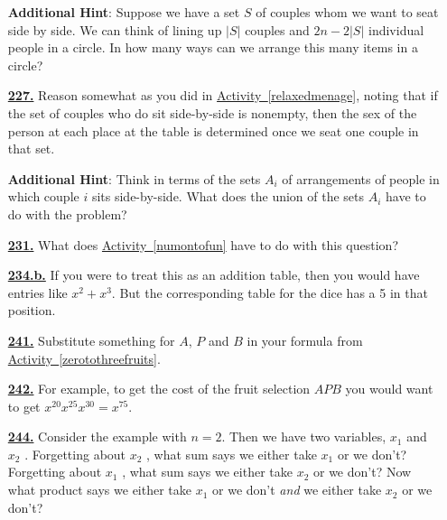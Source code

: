 \documentclass[10pt,]{book}
\theoremstyle{plain}
\theoremstyle{definition}
\theoremstyle{definition}
\theoremstyle{definition}
\numberwithin{equation}{chapter}
\begin{document}
\begin{itemize}[itemsep=1em]
\par\smallskip
\noindent\textbf{Additional Hint}: \hypertarget{p-1210}{}%
Suppose we have a set \(S\) of couples whom we want to seat side by side. We can think of lining up \(|S|\) couples and \(2n - 2|S|\) individual people in a circle.  In how many ways can we arrange this many items in a circle?%

\hypertarget{a-227}{}\item[\textbf{\hyperref[activity-220]{227.}}]
\hypertarget{p-1213}{}%
Reason somewhat as you did in \hyperref[relaxedmenage]{Activity~\ref{relaxedmenage}}, noting that if the set of couples who do sit side-by-side is nonempty, then the sex of the person at each place at the table is determined once we seat one couple in that set.%

\par\smallskip
\noindent\textbf{Additional Hint}: \hypertarget{p-1214}{}%
Think in terms of the sets \(A_i\) of arrangements of people in which couple \(i\) sits side-by-side. What does the union of the sets \(A_i\) have to do with the problem?%

\hypertarget{a-231}{}\item[\textbf{\hyperref[act_stirlingpie]{231.}}]
\hypertarget{p-1229}{}%
What does \hyperref[numontofun]{Activity~\ref{numontofun}} have to do with this question?%

\hypertarget{a-234.b}{}\item[\textbf{\hyperref[task-237]{234.b.}}]
\hypertarget{p-1246}{}%
If you were to treat this as an addition table, then you would have entries like \(x^2+x^3\).  But the corresponding table for the dice has a 5 in that position.%

\hypertarget{a-241}{}\item[\textbf{\hyperref[activity-234]{241.}}]
\hypertarget{p-1270}{}%
Substitute something for \(A\), \(P\) and \(B\) in your formula from \hyperref[zerotothreefruits]{Activity~\ref{zerotothreefruits}}.%

\hypertarget{a-242}{}\item[\textbf{\hyperref[activity-235]{242.}}]
\hypertarget{p-1273}{}%
For example, to get the cost of the fruit selection \(AP B\) you would want to get \(x^{20} x^{25} x^{30} = x^{75}\).%

\hypertarget{a-244}{}\item[\textbf{\hyperref[reprovingbinomialtheorem]{244.}}]
\hypertarget{p-1278}{}%
Consider the example with \(n = 2\). Then we have two variables, \(x_1\) and \(x_2\) .  Forgetting about \(x_2\) , what sum says we either take \(x_1\) or we don't? Forgetting about \(x_1\) , what sum says we either take \(x_2\) or we don't? Now what product says we either take \(x_1\) or we don't \emph{and} we either take \(x_2\) or we don't?%


\end{itemize}
\end{document}
